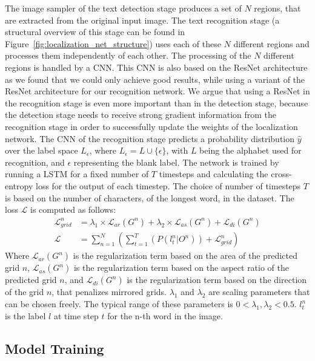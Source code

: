 \documentclass[letterpaper]{article}
\begin{document}
	The image sampler of the text detection stage produces a set of $N$ regions, that are extracted from the original input image.
	The text recognition stage (a structural overview of this stage can be found in Figure~\ref{fig:localization_net_structure}) uses each of these $N$ different regions and processes them independently of each other.
	The processing of the $N$ different regions is handled by a \ac{CNN}.
	This \ac{CNN} is also based on the ResNet architecture as we found that we could only achieve good results, while using a variant of the ResNet architecture for our recognition network.
	We argue that using a ResNet in the recognition stage is even more important than in the detection stage, because the detection stage needs to receive strong gradient information from the recognition stage in order to successfully update the weights of the localization network.
	The \ac{CNN} of the recognition stage predicts a probability distribution $\hat{y}$ over the label space $L_{\epsilon}$, where $L_{\epsilon} = L \cup \{\epsilon\}$, with $L$ being the alphabet used for recognition, and $\epsilon$ representing the blank label.
	The network is trained by running a \ac{LSTM} for a fixed number of $T$ timesteps and calculating the cross-entropy loss for the output of each timestep.
	The choice of number of timesteps $T$ is based on the number of characters, of the longest word, in the dataset.
	The loss $\mathcal{L}$ is computed as follows:
	\begin{align}
		\mathcal{L}_{grid}^n &= \lambda_1 \times \mathcal{L}_{ar}(G^n) + \lambda_2 \times \mathcal{L}_{as}(G^n) + \mathcal{L}_{di}(G^n) \label{eq:loc_loss} \\
		\mathcal{L} &= \sum^{N}_{n=1} (\sum^{T}_{t = 1} (P(l_t^n | O^n)) + \mathcal{L}_{grid}^n)
	\end{align}
	Where $\mathcal{L}_{ar}(G^n)$ is the regularization term based on the area of the predicted grid $n$, $\mathcal{L}_{as}(G^n)$ is the regularization term based on the aspect ratio of the predicted grid $n$, and $\mathcal{L}_{di}(G^n)$ is the regularization term based on the direction of the grid $n$, that penalizes mirrored grids.
	$\lambda_1$ and $\lambda_2$ are scaling parameters that can be chosen freely.
	The typical range of these parameters is $0 < \lambda_1,\lambda_2 < 0.5$.
	$l_t^n$ is the label $l$ at time step $t$ for the n-th word in the image.

	\subsection{Model Training}
\end{document}
